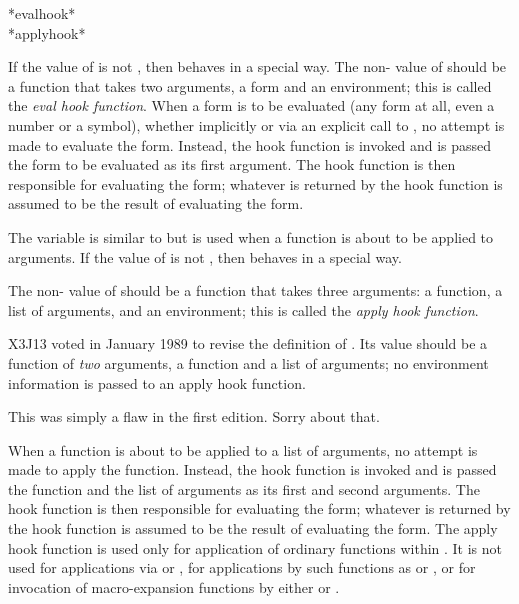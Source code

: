 \begin{defun}[Variable]
*evalhook* \\
*applyhook*

If the value of  is not {\false}, then  behaves
in a special way.  The non-{\false} value of  should be a function
that takes two arguments, a form and an environment;
this is called the {\it eval hook function}.
When a form is to be evaluated (any form at all, even a number or a symbol),
whether implicitly or via an explicit call to , no attempt
is made to evaluate the form.
Instead, the hook function is invoked and is passed the form to be evaluated
as its first argument.  The hook function is then responsible for
evaluating the form; whatever is returned by the hook function is assumed
to be the result of evaluating the form.

The variable  is similar to  but is used
when a function is about to be applied to arguments.
If the value of  is not {\false}, then  behaves
in a special way.
\begin{obsolete}
The non-{\false} value of  should be a function
that takes three arguments: a function, a list of arguments,
and an environment;
this is called the {\it apply hook function}.
\end{obsolete}

\begin{new}
X3J13 voted in January 1989
to revise the definition of .
Its value should be a function of {\it two} arguments,
a function and a list of arguments; no environment information is passed
to an apply hook function.

This was simply a flaw in the first edition.  Sorry about that.
\end{new}

When a function is about to be applied to a list of arguments,
no attempt is made to apply the function.
Instead, the hook function is invoked and is passed the function and the list
of arguments
as its first and second arguments.  The hook function is then responsible for
evaluating the form; whatever is returned by the hook function is assumed
to be the result of evaluating the form.
The apply hook function is used only for application of ordinary functions
within .  It is not used for applications via  or
, for applications by such functions as  or
, or for invocation of macro-expansion functions
by either  or .


\end{defun}
